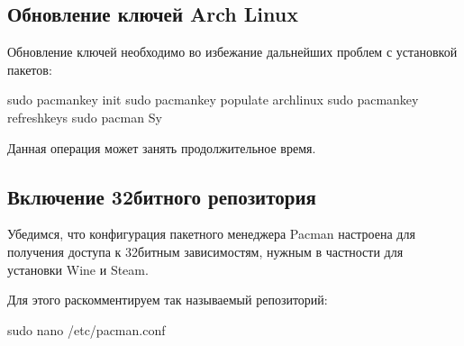 \documentclass[letterpaper,10pt,russian,openany]{sphinxmanual}
\begin{document}
\subsection{Обновление ключей Arch Linux}
\label{\detokenize{source/first-steps:arch-linux}}\label{\detokenize{source/first-steps:gpg-update}}\label{\detokenize{source/first-steps:index-1}}
\sphinxAtStartPar
Обновление ключей необходимо во избежание дальнейших проблем с установкой пакетов:

\begin{sphinxVerbatim}[commandchars=\\\{\}]
sudo pacman\PYGZhy{}key \PYGZhy{}\PYGZhy{}init               
sudo pacman\PYGZhy{}key \PYGZhy{}\PYGZhy{}populate archlinux 
sudo pacman\PYGZhy{}key \PYGZhy{}\PYGZhy{}refresh\PYGZhy{}keys       
sudo pacman \PYGZhy{}Sy                      
\end{sphinxVerbatim}

\sphinxAtStartPar
Данная операция может занять продолжительное время.

\ignorespaces 

\subsection{Включение 32\sphinxhyphen{}битного репозитория}
\label{\detokenize{source/first-steps:multilib-repository}}\label{\detokenize{source/first-steps:index-2}}\label{\detokenize{source/first-steps:id2}}
\sphinxAtStartPar
Убедимся, что конфигурация пакетного менеджера Pacman настроена для получения доступа к 32\sphinxhyphen{}битным зависимостям, нужным в частности для установки Wine и Steam.

\sphinxAtStartPar
Для этого раскомментируем так называемый  репозиторий:

\begin{sphinxVerbatim}[commandchars=\\\{\}]
sudo nano /etc/pacman.conf           
\end{sphinxVerbatim}

\noindent{}
\end{document}
